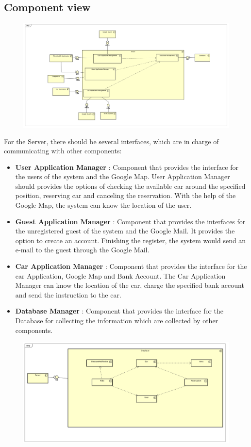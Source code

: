 \documentclass{article}
\begin{document}
	\subsection{Component view}
	\begin{figure}[h]
	\includegraphics[width=\textwidth]{CV_Server}
	\end{figure}
	For the Server, there should be several interfaces, which are in charge of communicating with other components: 
	\begin{itemize}
		\item \textbf{User Application Manager} : Component that provides the interface for the users of the system and the Google Map. User Application Manager should provides the options of checking the available car around the specified position, reserving car and canceling the reservation. With the help of the Google Map, the system can know the location of the user.
		\item \textbf{Guest Application Manager} : Component that provides the interfaces for the unregistered guest of the system and the Google Mail. It provides the option to create an account. Finishing the register, the system would send an e-mail to the guest through the Google Mail.
		\item \textbf{Car Application Manager} : Component that provides the interface for the car Application, Google Map and Bank Account. The Car Application Manager can know the location of the car, charge the specified bank account and send the instruction to the car.
		\item \textbf{Database Manager} : Component that provides the interface for the Database for collecting the information which are collected by other components.   
	\end{itemize}
	\newpage
	\begin{figure}[h]
	\includegraphics[width=\textwidth]{CV_Database}
	\end{figure}
\end{document}
